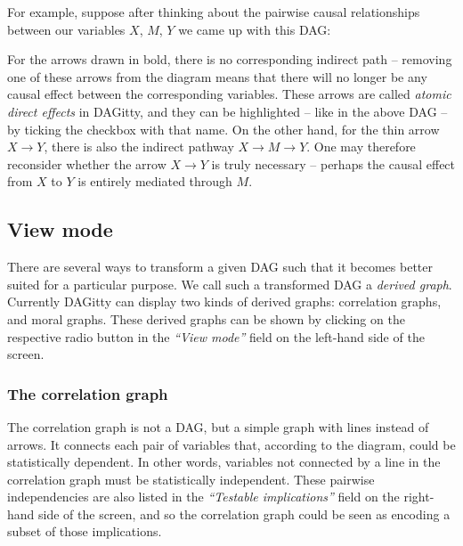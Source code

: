\documentclass[a4paper]{article} %
\newcommand{\pp}{{\sc DAG}itty\xspace}
\newcommand{\action}[1]{\emph{``#1''}}
\begin{document}
For example, suppose after thinking about the pairwise causal relationships between
our variables $X$, $M$, $Y$ we came up with this DAG:


For the arrows drawn in bold, there is no corresponding indirect path -- removing
one of these arrows from the diagram means that there will no longer be any causal 
effect between the corresponding variables. These arrows are called \emph{atomic direct
effects} in \pp, and they can be highlighted -- like in the above DAG -- by ticking
the checkbox with that name. 
On the other hand, for the thin arrow 
$X \to Y$, there is also the indirect pathway $X \to M \to Y$. One may therefore reconsider
whether the arrow $X \to Y$ is truly necessary -- 
perhaps the causal effect from $X$ to $Y$ is entirely mediated through $M$.

\subsection{View mode}

There are several ways to transform a given DAG such that it becomes better suited for 
a particular purpose. We call such a transformed DAG a \emph{derived graph}. Currently
\pp can display two kinds of derived graphs: correlation graphs, and moral graphs.
These derived graphs can be shown by clicking on the respective radio button in the
\action{View mode} field on the left-hand side of the screen. 

\subsubsection{The correlation graph}

The correlation graph is not a DAG, but a simple graph with lines instead of arrows. 
It connects each pair of variables that, according to the diagram, could be statistically
dependent. In other words, variables not connected by a line in the correlation graph
must be statistically independent. These pairwise independencies are also listed in the
\action{Testable implications} field on the right-hand side of the screen, and so the
correlation graph could be seen as encoding a subset of those implications. 
\end{document}
